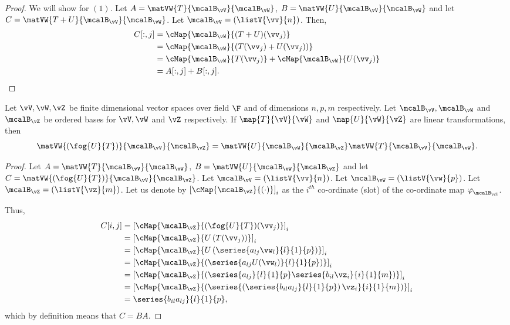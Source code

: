 \begin{proof}
    We will show for $(1)$.
    Let $A = \matVW{T}{\mcalB_{\vV}}{\mcalB_{\vW}}$, $B = \matVW{U}{\mcalB_{\vV}}{\mcalB_{\vW}}$ and let 
    $C = \matVW{T + U}{\mcalB_{\vV}}{\mcalB_{\vW}}$.
    Let $\mcalB_{\vV} = \left(\listV{\vv}{n}\right)$. Then,
    \begin{align*}
	C[:,j] &= \cMap{\mcalB_{\vW}}{(T+U)(\vv_{j})}\\
	& = \cMap{\mcalB_{\vW}}{\left(T(\vv_{j}) + U(\vv_{j})\right)}\\
	& = \cMap{\mcalB_{\vW}}{T(\vv_j)} + \cMap{\mcalB_{\vW}}{U(\vv_j)}\\
	& = A[:,j] + B[:,j].
    \end{align*}
\end{proof}
\begin{Theorem}
    Let $\vV,\vW,\vZ$ be finite dimensional vector spaces over field $\F$ and of dimensions $n,p,m$
    respectively. Let $\mcalB_{\vV},\mcalB_{\vW}$ and $\mcalB_{\vZ}$ be ordered bases for $\vV,\vW$ and $\vZ$
    respectively. If $\map{T}{\vV}{\vW}$ and $\map{U}{\vW}{\vZ}$ are linear transformations, then
    \[\matVW{(\fog{U}{T})}{\mcalB_{\vV}}{\mcalB_{\vZ}} = 
	\matVW{U}{\mcalB_{\vW}}{\mcalB_{\vZ}}\matVW{T}{\mcalB_{\vV}}{\mcalB_{\vW}}. \]
\end{Theorem}
\begin{proof}
    Let $A = \matVW{T}{\mcalB_{\vV}}{\mcalB_{\vW}}$, $B = \matVW{U}{\mcalB_{\vW}}{\mcalB_{\vZ}}$ and let 
    $C = \matVW{(\fog{U}{T})}{\mcalB_{\vV}}{\mcalB_{\vZ}}$.
    Let $\mcalB_{\vV} = \left(\listV{\vv}{n}\right)$. 
    Let $\mcalB_{\vW} = \left(\listV{\vw}{p}\right)$. 
    Let $\mcalB_{\vZ} = \left(\listV{\vz}{m}\right)$. 
    Let us denote by ${\left[\cMap{\mcalB_{\vZ}}{(\cdot)}\right]}_{i}$ as the $i^{th}$ 
    co-ordinate (slot) of the co-ordinate
    map $\varphi^{}_{\mcalB_{\vZ}}$.

    Thus,
    \begin{align*}
	C[i,j] &= {\left[\cMap{\mcalB_{\vZ}}{(\fog{U}{T})(\vv_{j})}\right]}_{i}\\
	& = {\left[\cMap{\mcalB_{\vZ}}{U\left(T(\vv_{j})\right)}\right]}_{i}\\
	& = {\left[\cMap{\mcalB_{\vZ}}{U\left(\series{a_{lj}\vw_{l}}{l}{1}{p}\right)}\right]}_{i}\\
	& = {\left[\cMap{\mcalB_{\vZ}}{\left(\series{a_{lj}U(\vw_{l})}{l}{1}{p}\right)}\right]}_{i}\\
	& = {\left[\cMap{\mcalB_{\vZ}}{\left(\series{a_{lj}}{l}{1}{p}\series{b_{il}\vz_{i}}{i}{1}{m}\right)}\right]}_{i}\\
	& = {\left[\cMap{\mcalB_{\vZ}}{\left(\series{\left(\series{b_{il}a_{lj}}{l}{1}{p}\right)\vz_{i}}{i}{1}{m}\right)}\right]}_{i}\\
	& = \series{b_{il}a_{lj}}{l}{1}{p},\\
    \end{align*}
    which by definition means that $C = BA$.
\end{proof}
